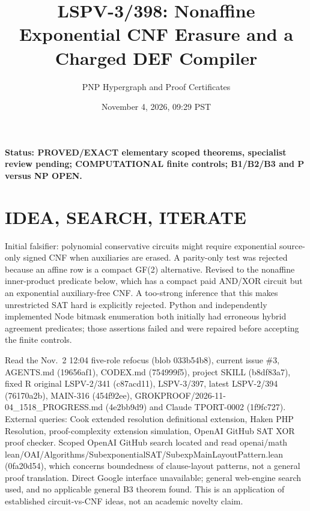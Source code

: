 \documentclass[11pt]{article}
\title{LSPV-3/398: Nonaffine Exponential CNF Erasure and a Charged DEF Compiler}
\author{PNP Hypergraph and Proof Certificates}
\date{November 4, 2026, 09:29 PST}
\begin{document}
\maketitle
\noindent \textbf{Status: PROVED/EXACT elementary scoped theorems, specialist review pending; COMPUTATIONAL finite controls; B1/B2/B3 and P versus NP OPEN.}
\section*{IDEA, SEARCH, ITERATE}
Initial falsifier: polynomial conservative circuits might require exponential source-only signed CNF when auxiliaries are erased. A parity-only test was rejected because an affine row is a compact GF(2) alternative. Revised to the nonaffine inner-product predicate below, which has a compact paid AND/XOR circuit but an exponential auxiliary-free CNF. A too-strong inference that this makes unrestricted SAT hard is explicitly rejected. Python and independently implemented Node bitmask enumeration both initially had erroneous hybrid agreement predicates; those assertions failed and were repaired before accepting the finite controls.
\par Read the Nov.~2 12:04 five-role refocus (blob 033b54b8), current issue \#3, AGENTS.md (19656af1), CODEX.md (754999f5), project SKILL (b8df83a7), fixed R original LSPV-2/341 (c87acd11), LSPV-3/397, latest LSPV-2/394 (76170a2b), MAIN-316 (454f92ee), GROKPROOF/2026-11-04\_1518\_PROGRESS.md (4e2bb9d9) and Claude TPORT-0002 (1f9fc727). External queries: Cook extended resolution definitional extension, Haken PHP Resolution, proof-complexity extension simulation, OpenAI GitHub SAT XOR proof checker. Scoped OpenAI GitHub search located and read openai/math lean/OAI/Algorithms/SubexponentialSAT/SubexpMainLayoutPattern.lean (0fa20d54), which concerns boundedness of clause-layout patterns, not a general proof translation. Direct Google interface unavailable; general web-engine search used, and no applicable general B3 theorem found. This is an application of established circuit-vs-CNF ideas, not an academic novelty claim.
\end{document}
